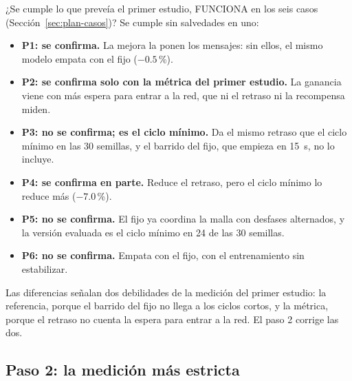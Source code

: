 ¿Se cumple lo que preveía el primer estudio, FUNCIONA en los seis casos
(Sección~\ref{sec:plan-casos})? Se cumple sin salvedades en uno:
\begin{itemize}
  \item \textbf{P1: se confirma.} La mejora la ponen los mensajes:
    sin ellos, el mismo modelo empata con el fijo ($-0.5$\,\%).
  \item \textbf{P2: se confirma solo con la métrica del primer estudio.} La ganancia
    viene con más espera para entrar a la red, que ni el retraso ni la
    recompensa miden.
  \item \textbf{P3: no se confirma; es el ciclo mínimo.} Da el mismo
    retraso que el ciclo mínimo en las 30 semillas, y el barrido del
    fijo, que empieza en 15~s, no lo incluye.
  \item \textbf{P4: se confirma en parte.} Reduce el retraso, pero el
    ciclo mínimo lo reduce más ($-7.0$\,\%).
  \item \textbf{P5: no se confirma.} El fijo ya coordina la malla con desfases
    alternados, y la versión evaluada es el ciclo mínimo en 24 de las 30
    semillas.
  \item \textbf{P6: no se confirma.} Empata con el fijo, con el
    entrenamiento sin estabilizar.
\end{itemize}
Las diferencias señalan dos debilidades de la medición del primer
estudio: la referencia, porque el barrido del fijo no llega a los
ciclos cortos, y la métrica, porque el retraso no cuenta la espera para
entrar a la red. El paso 2 corrige las dos.

\subsection{Paso 2: la medición más estricta}
\label{sec:robustez}

